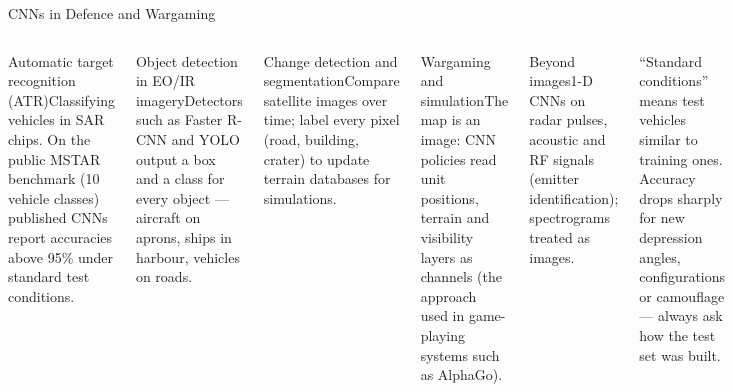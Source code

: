 \documentclass[aspectratio=169,10pt]{beamer}
\begin{document}
\begin{frame}{CNNs in Defence and Wargaming}
\begin{columns}[T]
\begin{cbox}{Automatic target recognition (ATR)}\scriptsize Classifying vehicles in SAR chips. On the public MSTAR benchmark (10 vehicle classes) published CNNs report accuracies above 95\% under standard test conditions.\end{cbox}
\begin{cbox}{Object detection in EO/IR imagery}\scriptsize Detectors such as Faster R-CNN and YOLO output a box and a class for every object --- aircraft on aprons, ships in harbour, vehicles on roads.\end{cbox}
\begin{cbox}{Change detection and segmentation}\scriptsize Compare satellite images over time; label every pixel (road, building, crater) to update terrain databases for simulations.\end{cbox}
\begin{cbox}{Wargaming and simulation}\scriptsize The map is an image: CNN policies read unit positions, terrain and visibility layers as channels (the approach used in game-playing systems such as AlphaGo).\end{cbox}
\begin{cbox}{Beyond images}\scriptsize 1-D CNNs on radar pulses, acoustic and RF signals (emitter identification); spectrograms treated as images.\end{cbox}
\begin{ibox}\scriptsize ``Standard conditions'' means test vehicles similar to training ones. Accuracy drops sharply for new depression angles, configurations or camouflage --- always ask how the test set was built.\end{ibox}
\end{columns}
\end{frame}
\end{document}

